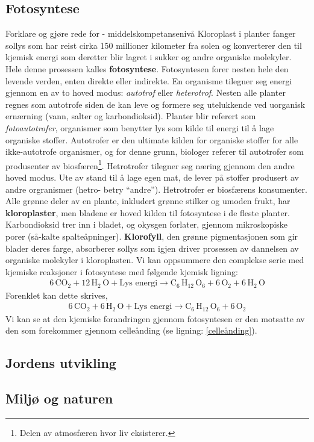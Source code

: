 \documentclass[main.tex]{subfiles}
\begin{document}
\subsection{Fotosyntese}
{\color{Blue}Forklare og gjøre rede for - middelskompetansenivå}
\newline\newline
Kloroplast i planter fanger sollys som har reist cirka 150 millioner kilometer fra solen og konverterer den til kjemisk energi som deretter blir lagret i sukker og andre organiske molekyler. Hele denne prosessen kalles \textbf{fotosyntese}.
\newline\newline
Fotosyntesen forer nesten hele den levende verden, enten direkte eller indirekte. En organisme tilegner seg energi gjennom en av to hoved modus: \emph{autotrof} eller \emph{heterotrof}. Nesten alle planter regnes som autotrofe siden de kan leve og formere seg utelukkende ved uorganisk ernærning (vann, salter og karbondioksid). Planter blir referert som \emph{fotoautotrofer}, organismer som benytter lys som kilde til energi til å lage organiske stoffer. Autotrofer er den ultimate kilden for organiske stoffer for alle ikke-autotrofe organismer, og for denne grunn, biologer referer til autotrofer som produsenter av biosfæren\footnote{Delen av atmosfæren hvor liv eksisterer.}. Hetrotrofer tilegner seg næring gjennom den andre hoved modus. Ute av stand til å lage egen mat, de lever på stoffer produsert av andre orgranismer (hetro- betry ``andre''). Hetrotrofer er biosfærens konsumenter.
\newline\newline
Alle grønne deler av en plante, inkludert grønne stilker og umoden frukt, har \textbf{kloroplaster}, men bladene er hoved kilden til fotosyntese i de fleste planter. Karbondioksid trer inn i bladet, og okysgen forlater, gjennom mikroskopiske porer (så-kalte spalteåpninger). \textbf{Klorofyll}, den grønne pigmentasjonen som gir blader deres farge, absorberer sollys som igjen driver prosessen av dannelsen av organiske molekyler i kloroplasten. Vi kan oppsummere den complekse serie med kjemiske reaksjoner i fotosyntese med følgende kjemisk ligning:
\begin{align*}
6\,\text{CO}_2 + 12\,\text{H}_2\,\text{O} + \text{Lys energi} \longrightarrow \text{C}_6\,\text{H}_{12}\,\text{O}_6 + 6\,\text{O}_2 + 6\,\text{H}_2\,\text{O}
\end{align*}
Forenklet kan dette skrives,
\begin{align}
\label{fotosyntese}
6\,\text{CO}_2 + 6\,\text{H}_2\,\text{O} + \text{Lys energi} \longrightarrow \text{C}_6\,\text{H}_{12}\,\text{O}_6 + 6\,\text{O}_2
\end{align}
Vi kan se at den kjemiske forandringen gjennom fotosyntesen er den motsatte av den som forekommer gjennom celleånding (se ligning: \ref{celleånding}).

\subsection{Jordens utvikling}

\subsection{Miljø og naturen}
\end{document}
